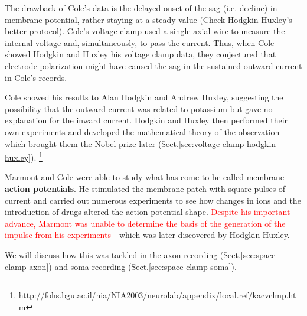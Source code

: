 The drawback of Cole's data is the delayed onset of the sag (i.e. decline) in
membrane potential, rather staying at a steady value (Check Hodgkin-Huxley's
better protocol).  Cole's voltage clamp used a single axial wire to measure the
internal voltage and, simultaneously, to pass the current. Thus, when Cole
showed Hodgkin and Huxley his voltage clamp data, they conjectured that
electrode polarization might have caused the sag in the sustained outward
current in Cole's records.

Cole showed his results to Alan Hodgkin and Andrew Huxley, suggesting the
possibility that the outward current was related to potassium but gave no
explanation for the inward current. Hodgkin and Huxley then performed their own
experiments and developed the mathematical theory of the observation which
brought them the Nobel prize later
(Sect.\ref{sec:voltage-clamp-hodgkin-huxley}).
\footnote{\url{http://fohs.bgu.ac.il/nia/NIA2003/neurolab/appendix/local.ref/kacvclmp.htm}}


Marmont and Cole were able to study what has come to be called
membrane {\bf action potentials}. He stimulated the membrane patch with square
pulses of current and carried out numerous experiments to see how changes in
ions and the introduction of drugs altered the action potential shape.
\textcolor{red}{Despite his important advance, Marmont was unable to determine
the basis of the generation of the impulse from his experiments} - which was
later discovered by Hodgkin-Huxley.

We will discuss how this was tackled in the axon recording
(Sect.\ref{sec:space-clamp-axon}) and soma recording
(Sect.\ref{sec:space-clamp-soma}).


%
%

